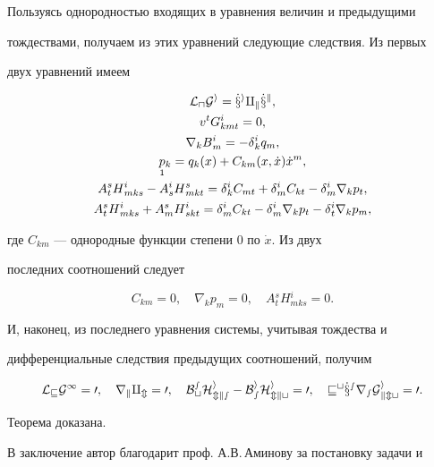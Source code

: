 Пользуясь однородностью входящих в уравнения величин и предыдущими 


тождествами, получаем из этих уравнений следующие следствия. Из первых 


двух уравнений имеем 


\begin{gather*} 


\cal L_uG^i=\Dot x^iq_k\Dot x^k,\\ 


v^tG{}^i_{kmt}=0,\\ 


\nabla_kB{}^i_m=-\delta{}^i_kq_m,\\ 


\down{1}{p}{}_k=q_k(x)+C_{km}(x,\Dot x)\Dot x^m,\\ 


A{}^s_tH{}^i_{mks}-A{}^i_sH{}^s_{mkt}=\delta{}^i_kC_{mt} 


+\delta{}^i_mC_{kt}-\delta{}^i_m\nabla_kp_t,\\ 


A{}^s_tH{}^i_{mks}+A{}^s_mH{}^i_{skt}= 


\delta{}^i_mC_{kt}-\delta{}^i_m\nabla_kp_t- 


\delta{}^i_t\nabla_kp_m, 


\end{gather*} 


где $C_{km}$ --- однородные функции степени 0 по $\Dot x$. Из двух 


последних соотношений следует 


$$ 


C_{km}=0,\quad \nabla_kp_m=0,\quad A{}^s_tH{}^i_{mks}=0. 


$$ 


И, наконец, из последнего уравнения системы, учитывая тождества и 


дифференциальные следствия предыдущих соотношений, получим 


$$ 


\cal L_vG^1=0,\quad \nabla_kq_m=0,\quad 


B{}^s_tH{}^i_{mks}-B{}^i_sH{}^i_{mkt}=0,\quad 


v^t\Dot x^s\nabla_sG{}^i_{kmt}=0. 


$$ 


Теорема доказана. 


 


В заключение автор благодарит проф. А.В.\,Аминову за постановку задачи и 


